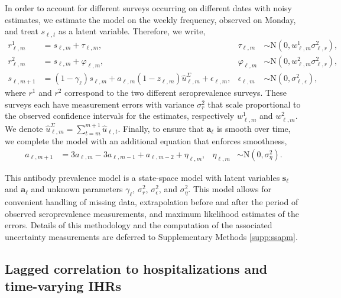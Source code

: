 In order to account for different surveys occurring on different dates with
noisy estimates, we estimate the model on the weekly frequency, observed on
Monday, and treat $s_{\ell,t}$ as a latent variable. Therefore, we write,
\begin{align}
\label{eq:waningpr}
r^1_{\ell,m} &= s_{\ell,m} + \tau_{\ell,m}, 
  & \tau_{\ell,m} &\sim \textrm{N}(0, w^1_{\ell,m}\sigma^2_{\ell,r}),\\
r^2_{\ell,m} &= s_{\ell,m} + \varphi_{\ell,m}, 
  & \varphi_{\ell,m} &\sim \textrm{N}(0, w^2_{\ell,m}\sigma^2_{\ell,r}),\\
s_{\ell,m+1} &= (1 -\gamma_{\ell}) s_{\ell,m} + 
  a_{\ell,m} (1 - z_{\ell,m}) \widehat{u}^\Sigma_{\ell,m} + \epsilon_{\ell,m}, 
  & \epsilon_{\ell,m} &\sim \textrm{N}(0, \sigma^2_{\ell,\epsilon}),
\end{align}
where $r^1$ and $r^2$ correspond to the two different seroprevalence surveys.
These surveys each have measurement errors with variance $\sigma^2_r$ that scale
proportional to the observed confidence intervals for the estimates,
respectively $w^1_{\ell,m}$ and $w^2_{\ell,m}$. We denote
$\widehat{u}^\Sigma_{\ell,m} = \sum_{t=m}^{m+1} \widehat{u}_{\ell,t}$. Finally,
to ensure that $\mathbf{a}_\ell$ is smooth over time, we complete the model with
an additional equation that enforces smoothness,
\begin{align}
a_{\ell,m+1} &= 3a_{\ell,m} - 3a_{\ell,m-1} + a_{\ell,m-2} + \eta_{\ell,m}, 
  &\eta_{\ell,m}  &\sim \textrm{N}(0, \sigma^2_{\eta}).
\end{align}
    
This antibody prevalence model is a state-space model with latent variables
$\mathbf{s}_{\ell}$ and $\mathbf{a}_{\ell}$ and unknown parameters $\gamma_\ell$,
$\sigma^2_r$, $\sigma^2_\epsilon$, and $\sigma^2_\eta$. This model
allows for convenient handling of missing data, extrapolation
before and after the period of observed seroprevalence measurements, and maximum
likelihood estimates of the errors. Details of this
methodology and the computation of the associated uncertainty measurements are
deferred to Supplementary Methods \autoref{supp:ssapm}.



\subsection{Lagged correlation to hospitalizations and time-varying IHRs} 
\label{sec:ihr-calculations}


